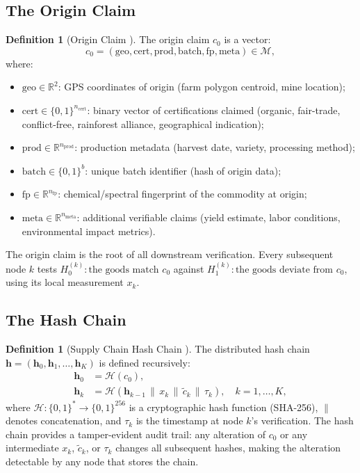 \documentclass[11pt,a4paper]{article}
\theoremstyle{definition}
\newtheorem{definition}[theorem]{Definition}
\theoremstyle{remark}
\newcommand{\R}{\mathbb{R}}
\newcommand{\claimSpace}{\mathcal{M}}
\newcommand{\hashFunc}{\mathcal{H}}
\newcommand{\hashChain}{\mathbf{h}}
\begin{document}
\subsection{The Origin Claim }

\begin{definition}[Origin Claim ]
\label{def:origin_claim}
The origin claim $c_0$ is a vector:
\begin{equation}
    c_0 = (\text{geo}, \text{cert}, \text{prod}, \text{batch}, \text{fp}, \text{meta}) \in \claimSpace,
    \label{eq:origin_claim}
\end{equation}
where:
\begin{itemize}
    \item $\text{geo} \in \R^2$: GPS coordinates of origin (farm polygon centroid, mine location);
    \item $\text{cert} \in \{0, 1\}^{n_{\mathrm{cert}}}$: binary vector of certifications claimed (organic, fair-trade, conflict-free, rainforest alliance, geographical indication);
    \item $\text{prod} \in \R^{n_{\mathrm{prod}}}$: production metadata (harvest date, variety, processing method);
    \item $\text{batch} \in \{0, 1\}^b$: unique batch identifier (hash of origin data);
    \item $\text{fp} \in \R^{n_{\mathrm{fp}}}$: chemical/spectral fingerprint of the commodity at origin;
    \item $\text{meta} \in \R^{n_{\mathrm{meta}}}$: additional verifiable claims (yield estimate, labor conditions, environmental impact metrics).
\end{itemize}
\end{definition}

The origin claim is the root of all downstream verification. Every subsequent node $k$ tests $H_0^{(k)}: \text{the goods match } c_0$ against $H_1^{(k)}: \text{the goods deviate from } c_0$, using its local measurement $x_k$.

\subsection{The Hash Chain }

\begin{definition}[Supply Chain Hash Chain ]
\label{def:hash_chain}
The distributed hash chain $\hashChain = (\hashChain_0, \hashChain_1, \ldots, \hashChain_K)$ is defined recursively:
\begin{align}
    \hashChain_0 &= \hashFunc(c_0), \label{eq:hash0} \\
    \hashChain_k &= \hashFunc(\hashChain_{k-1} \,\|\, x_k \,\|\, \tilde{c}_k \,\|\, \tau_k), \quad k = 1, \ldots, K, \label{eq:hash_k}
\end{align}
where $\hashFunc: \{0, 1\}^* \to \{0, 1\}^{256}$ is a cryptographic hash function (SHA-256), $\|$ denotes concatenation, and $\tau_k$ is the timestamp at node $k$'s verification. The hash chain provides a tamper-evident audit trail: any alteration of $c_0$ or any intermediate $x_k$, $\tilde{c}_k$, or $\tau_k$ changes all subsequent hashes, making the alteration detectable by any node that stores the chain.
\end{definition}
\end{document}
